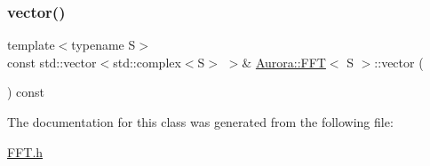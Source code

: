 \subsubsection{\texorpdfstring{vector()}{vector()}}
{\footnotesize\ttfamily template$<$typename S$>$ \\
const std\+::vector$<$std\+::complex$<$S$>$ $>$\& \hyperlink{class_aurora_1_1_f_f_t}{Aurora\+::\+F\+FT}$<$ S $>$\+::vector (\begin{DoxyParamCaption}{ }\end{DoxyParamCaption}) const\hspace{0.3cm}{\ttfamily [inline]}}



The documentation for this class was generated from the following file\+:\begin{DoxyCompactItemize}
\item 
\hyperlink{_f_f_t_8h}{F\+F\+T.\+h}\end{DoxyCompactItemize}
